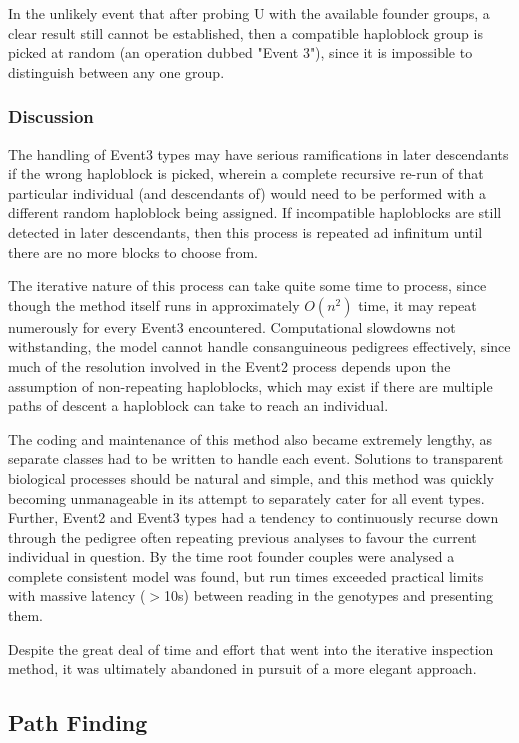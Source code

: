 In the unlikely event that after probing U with the available founder groups, a clear result still cannot be established, then a compatible haploblock group is picked at random (an operation dubbed "Event 3"), since it is impossible to distinguish between any one group.


\subsubsection{Discussion}\label{ref:haplo:eventdiscuss}
The handling of Event3 types may have serious ramifications in later descendants if the wrong haploblock is picked, wherein a complete recursive re-run of that particular individual (and descendants of) would need to be performed with a different random haploblock being assigned. If incompatible haploblocks are still detected in later descendants, then this process is repeated ad infinitum until there are no more blocks to choose from. 

The iterative nature of this process can take quite some time to process, since though the method itself runs in approximately $O(n^2)$ time, it may repeat numerously for every Event3 encountered. Computational slowdowns not withstanding, the model cannot handle consanguineous pedigrees effectively, since much of the resolution involved in the Event2 process depends upon the assumption of non-repeating haploblocks, which may exist if there are multiple paths of descent a haploblock can take to reach an individual.

The coding and maintenance of this method also became extremely lengthy, as separate classes had to be written to handle each event. Solutions to transparent biological processes should be natural and simple, and this method was quickly becoming unmanageable in its attempt to separately cater for all event types. Further, Event2 and Event3 types had a tendency to continuously recurse down through the pedigree often repeating previous analyses to favour the current individual in question. By the time root founder couples were analysed a complete consistent model was found, but run times exceeded practical limits with massive latency ($>$10s) between reading in the genotypes and presenting them.

Despite the great deal of time and effort that went into the iterative inspection method, it was ultimately abandoned in pursuit of a more elegant approach.

\subsection{Path Finding}

